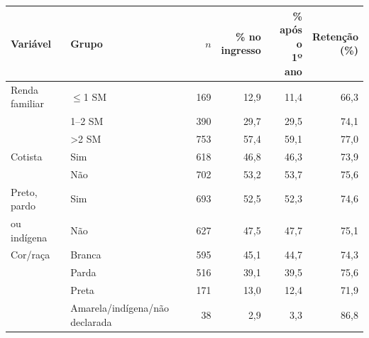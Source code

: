 \begin{tabular}{llrrrr}
\toprule
Variável & Grupo & $n$ & \makecell[r]{\% no\\ingresso} & \makecell[r]{\% após o\\1º ano} & \makecell[r]{Retenção\\(\%)} \\
\midrule
Renda familiar & $\leq$1 SM & 169 & 12,9 & 11,4 & 66,3 \\
 & 1--2 SM & 390 & 29,7 & 29,5 & 74,1 \\
 & >2 SM & 753 & 57,4 & 59,1 & 77,0 \\
Cotista & Sim & 618 & 46,8 & 46,3 & 73,9 \\
 & Não & 702 & 53,2 & 53,7 & 75,6 \\
Preto, pardo & Sim & 693 & 52,5 & 52,3 & 74,6 \\
ou indígena & Não & 627 & 47,5 & 47,7 & 75,1 \\
Cor/raça & Branca & 595 & 45,1 & 44,7 & 74,3 \\
 & Parda & 516 & 39,1 & 39,5 & 75,6 \\
 & Preta & 171 & 13,0 & 12,4 & 71,9 \\
 & Amarela/indígena/não declarada & 38 & 2,9 & 3,3 & 86,8 \\
\bottomrule
\end{tabular}
